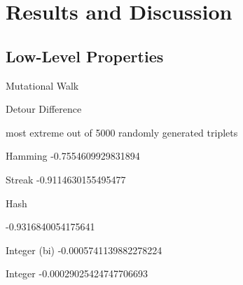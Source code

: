 \section{Results and Discussion}

\subsection{Low-Level Properties}

Mutational Walk




Detour Difference



most extreme out of 5000 randomly generated triplets

Hamming
-0.7554609929831894

Streak
-0.9114630155495477

Hash

-0.9316840054175641

Integer (bi)
-0.0005741139882278224

Integer
-0.00029025424747706693

